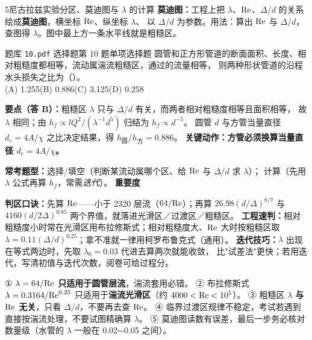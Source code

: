 \begin{kaodian}{5}{尼古拉兹实验分区、莫迪图与 $\lambda$ 的计算}
\textbf{莫迪图：}工程上把 $\lambda$、$\mathrm{Re}$、$\Delta/d$ 的关系绘成\textbf{莫迪图}，横坐标 $\mathrm{Re}$、纵坐标 $\lambda$、
以 $\Delta/d$ 为参数。用法：算出 $\mathrm{Re}$ 与 $\Delta/d$，查图得 $\lambda$。图中最上方一条水平线就是粗糙区。

\begin{zhenti}{题库 \texttt{10.pdf} 选择题第 10 题}{单项选择题}
圆管和正方形管道的断面面积、长度、相对粗糙度都相等，流动属湍流粗糙区，通过的流量相等，
则两种形状管道的沿程水头损失之比为（\quad）。\\
(A) 1.255\quad (B) 0.886\quad (C) 3.125\quad (D) 0.258
\end{zhenti}
\noindent\textbf{要点（答 B）：}粗糙区 $\lambda$ 只与 $\Delta/d$ 有关，而两者相对粗糙度相等且面积相等，
故 $\lambda$ 相同；由 $h_f\propto lQ^2/(\lambda^{-1}d^5)$ 归结为 $h_f\propto d^{-5}$。
圆管 $d$ 与方管当量直径 $d_e=4A/\chi$ 之比决定结果，得 $h_{\text{圆}}/h_{\text{方}}=0.886$。
\textbf{关键动作：方管必须换算当量直径 $d_e=4A/\chi$。}

\textbf{常考题型：}选择/填空（判断某流动属哪个区、给 $\mathrm{Re}$ 与 $\Delta/d$ 求 $\lambda$）；
计算（先用 $\lambda$ 公式再算 $h_f$，常需\emph{迭代}）。
\textbf{重要度 }\quad{}\quad{}

\begin{banfa}
\textbf{判区口诀：}先算 $\mathrm{Re}$——小于 2320 层流（$64/\mathrm{Re}$）；再算 $26.98(d/\Delta)^{8/7}$ 与 $4160(d/2\Delta)^{0.85}$
两个界值，就落进光滑区／过渡区／粗糙区。
\textbf{工程速判：}相对粗糙度小时常在光滑区用布拉修斯式；相对粗糙度大、$\mathrm{Re}$ 大时按粗糙区取
$\lambda=0.11(\Delta/d)^{0.25}$；拿不准就一律用柯罗布鲁克式（通用）。
\textbf{迭代技巧：}$\lambda$ 出现在等式两边时，先取 $\lambda_0=0.03$ 代进去算两次就能收敛，
比"试差法"更快；若用迭代，写清初值与迭代次数，阅卷可给过程分。
\end{banfa}

\begin{yicuo}
① \textbf{$\lambda=64/\mathrm{Re}$ 只适用于圆管层流}，湍流套用必错。
② 布拉修斯式 $\lambda=0.3164/\mathrm{Re}^{0.25}$ 只适用于\textbf{湍流光滑区}（约 $4000<\mathrm{Re}<10^5$）。
③ 粗糙区 $\lambda$ \textbf{与 $\mathrm{Re}$ 无关}，只看 $\Delta/d$，不要再去查 $\mathrm{Re}$。
④ 临界过渡区规律不稳定，考试若遇到直接按湍流处理，不要试图精确算 $\lambda$。
⑤ 莫迪图读数有误差，最后一步务必核对数量级（水管的 $\lambda$ 一般在 0.02$\sim$0.05 之间）。
\end{yicuo}
\end{kaodian}

